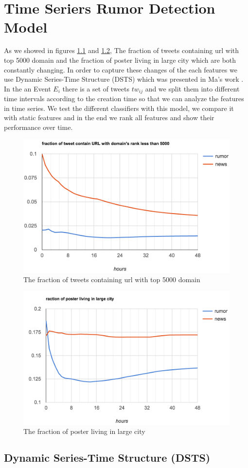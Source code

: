 
\chapter{Time Seriers Rumor Detection Model} %
\label{cha:timr_seriers_rumor_model}
As we showed in figures \ref{fig:Url5000} and \ref{fig:largecity}, The fraction of tweets containing url with top 5000 domain and the fraction of poster living in large city which are both constantly changing. In order to capture these changes of the each features we use Dynamic Series-Time Structure (DSTS) which was presented in Ma's work \cite{ma2015detect}. In the an Event $E_{i}$ there is a set of tweets $tw_{ij}$ and we split them into different time intervals according to the creation time so that we can analyze the features in time series. We test the different classifiers with this model, we compare it with static features and in the end we rank all features and show their performance over time.

\begin{figure}[!h]
\centering
\includegraphics[width=0.52\columnwidth]{images/url5000.png}
\caption{The fraction of tweets containing url with top 5000 domain}
\label{fig:Url5000}
\end{figure}
\begin{figure}[!h]
\centering
\includegraphics[width=0.52\columnwidth]{images/largecity.png}
\caption{The fraction of poster living in large city}
\label{fig:largecity}
\end{figure}
\newpage
  \section{ Dynamic Series-Time Structure (DSTS)} 
